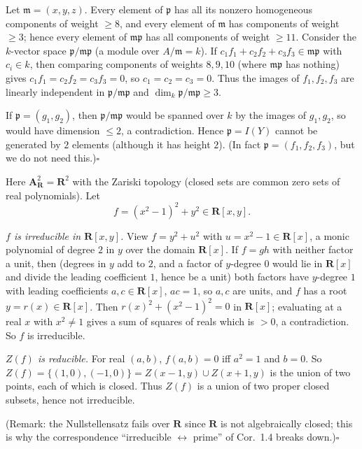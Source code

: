 \documentclass[11pt]{article}
\begin{document}
Let $\mathfrak m=(x,y,z)$. Every element of $\mathfrak p$ has all its nonzero homogeneous components of weight $\ge8$, and every element of $\mathfrak m$ has components of weight $\ge3$; hence every element of $\mathfrak m\mathfrak p$ has all components of weight $\ge11$. Consider the $k$-vector space $\mathfrak p/\mathfrak m\mathfrak p$ (a module over $A/\mathfrak m=k$). If $c_1f_1+c_2f_2+c_3f_3\in\mathfrak m\mathfrak p$ with $c_i\in k$, then comparing components of weights $8,9,10$ (where $\mathfrak m\mathfrak p$ has nothing) gives $c_1f_1=c_2f_2=c_3f_3=0$, so $c_1=c_2=c_3=0$. Thus the images of $f_1,f_2,f_3$ are linearly independent in $\mathfrak p/\mathfrak m\mathfrak p$ and $\dim_k\mathfrak p/\mathfrak m\mathfrak p\ge3$.

If $\mathfrak p=(g_1,g_2)$, then $\mathfrak p/\mathfrak m\mathfrak p$ would be spanned over $k$ by the images of $g_1,g_2$, so would have dimension $\le2$, a contradiction. Hence $\mathfrak p=I(Y)$ cannot be generated by $2$ elements (although it has height $2$). (In fact $\mathfrak p=(f_1,f_2,f_3)$, but we do not need this.)\hfill$\square$

\pf
Here $\mathbf A^2_{\mathbf R}=\mathbf R^2$ with the Zariski topology (closed sets are common zero sets of real polynomials). Let
\[
f=(x^2-1)^2+y^2\in\mathbf R[x,y].
\]

\emph{$f$ is irreducible in $\mathbf R[x,y]$.} View $f=y^2+u^2$ with $u=x^2-1\in\mathbf R[x]$, a monic polynomial of degree $2$ in $y$ over the domain $\mathbf R[x]$. If $f=gh$ with neither factor a unit, then (degrees in $y$ add to $2$, and a factor of $y$-degree $0$ would lie in $\mathbf R[x]$ and divide the leading coefficient $1$, hence be a unit) both factors have $y$-degree $1$ with leading coefficients $a,c\in\mathbf R[x]$, $ac=1$, so $a,c$ are units, and $f$ has a root $y=r(x)\in\mathbf R[x]$. Then $r(x)^2+(x^2-1)^2=0$ in $\mathbf R[x]$; evaluating at a real $x$ with $x^2\ne1$ gives a sum of squares of reals which is $>0$, a contradiction. So $f$ is irreducible.

\emph{$Z(f)$ is reducible.} For real $(a,b)$, $f(a,b)=0$ iff $a^2=1$ and $b=0$. So $Z(f)=\{(1,0),(-1,0)\}=Z(x-1,y)\cup Z(x+1,y)$ is the union of two points, each of which is closed. Thus $Z(f)$ is a union of two proper closed subsets, hence not irreducible.

(Remark: the Nullstellensatz fails over $\mathbf R$ since $\mathbf R$ is not algebraically closed; this is why the correspondence ``irreducible $\leftrightarrow$ prime'' of Cor.~1.4 breaks down.)\hfill$\square$
\end{document}
